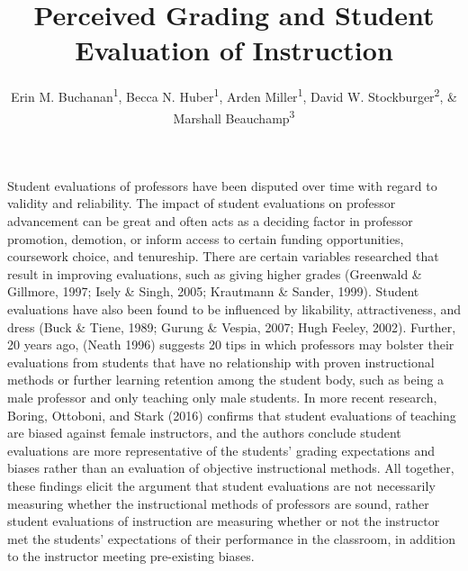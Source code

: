 \documentclass[man]{apa6}
\title{Perceived Grading and Student Evaluation of Instruction}
\author{Erin M. Buchanan\textsuperscript{1}, Becca N. Huber\textsuperscript{1}, Arden Miller\textsuperscript{1}, David W. Stockburger\textsuperscript{2}, \& Marshall Beauchamp\textsuperscript{3}}
\affiliation{
    \vspace{0.5cm}
          \textsuperscript{1} Missouri State University\\
          \textsuperscript{2} US Air Force Academy\\
          \textsuperscript{3} University of Missouri - Kansas City  }
\theoremstyle{definition}
\theoremstyle{definition}
\theoremstyle{definition}
\theoremstyle{remark}
\begin{document}
\maketitle

\setcounter{secnumdepth}{0}



Student evaluations of professors have been disputed over time with
regard to validity and reliability. The impact of student evaluations on
professor advancement can be great and often acts as a deciding factor
in professor promotion, demotion, or inform access to certain funding
opportunities, coursework choice, and tenureship. There are certain
variables researched that result in improving evaluations, such as
giving higher grades (Greenwald \& Gillmore, 1997; Isely \& Singh, 2005;
Krautmann \& Sander, 1999). Student evaluations have also been found to
be influenced by likability, attractiveness, and dress (Buck \& Tiene,
1989; Gurung \& Vespia, 2007; Hugh Feeley, 2002). Further, 20 years ago,
(Neath 1996) suggests 20 tips in which professors may bolster their
evaluations from students that have no relationship with proven
instructional methods or further learning retention among the student
body, such as being a male professor and only teaching only male
students. In more recent research, Boring, Ottoboni, and Stark (2016)
confirms that student evaluations of teaching are biased against female
instructors, and the authors conclude student evaluations are more
representative of the students' grading expectations and biases rather
than an evaluation of objective instructional methods. All together,
these findings elicit the argument that student evaluations are not
necessarily measuring whether the instructional methods of professors
are sound, rather student evaluations of instruction are measuring
whether or not the instructor met the students' expectations of their
performance in the classroom, in addition to the instructor meeting
pre-existing biases.
\end{document}
